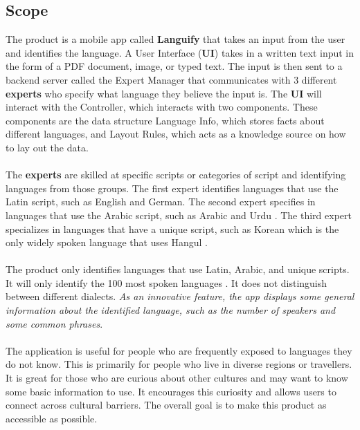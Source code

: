 \subsection{Scope}
\label{sub:scope}
The product is a mobile app called \textbf{Languify} that takes an input from the user and identifies the language. 
A User Interface (\textbf{UI}) takes in a written text input in the form of a PDF document, image, or typed text. 
The input is then sent to a backend server called the Expert Manager that communicates with 3 different \textbf{experts} who specify what language they believe the input is. 
The \textbf{UI} will interact with the Controller, which interacts with two components.
These components are the data structure Language Info, which stores facts about different languages, and Layout Rules, which acts as a knowledge source on how to lay out the data.\\ \\
The \textbf{experts} are skilled at specific scripts or categories of script and identifying languages from those groups. The first expert identifies languages that use the Latin script, such as English and German. 
The second expert specifies in languages that use the Arabic script, such as Arabic and Urdu \cite{Britannica2025_WritingSystems}. The third expert specializes in languages that have a unique script, such as Korean which is the only widely spoken language that uses Hangul \cite{Britannica2025_Hangul}. \\ \\
The product only identifies languages that use Latin, Arabic, and unique scripts. It will only identify the 100 most spoken languages \cite{Ethnologue2025}. It does not distinguish between different dialects. \textit{As an innovative feature, the app displays some general information about the identified language, such as the number of speakers and some common phrases}.\\ \\
The application is useful for people who are frequently exposed to languages they do not know. This is primarily for people who live in diverse regions or travellers. It is great for those who are curious about other cultures and may want to know some basic information to use. It encourages this curiosity and allows users to connect across cultural barriers. The overall goal is to make this product as accessible as possible.


